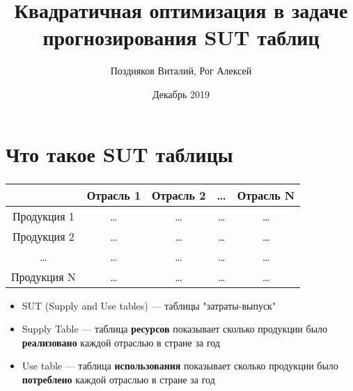 \documentclass{beamer}
\title{Квадратичная оптимизация в задаче прогнозирования SUT таблиц}
\author{Поздняков Виталий,  Рог Алексей}
\date{Декабрь 2019}
\begin{document}
\begin{frame}
\titlepage
\end{frame}

\section{Что такое SUT таблицы}

\begin{frame}
	\frametitle{\insertsection}

	\begin{center}
		\begin{tabular}{|c|c|c|c|c|}
			\hline
			& Отрасль 1 & Отрасль 2 & \dots & Отрасль N \\
			\hline
			Продукция 1	& \dots	& \dots	& \dots	& \dots \\
			Продукция 2	& \dots	& \dots	& \dots	& \dots \\
			\dots & \dots & \dots & \dots & \dots \\
			Продукция N	& \dots	& \dots	& \dots	& \dots \\
			\hline
		\end{tabular}
	\end{center}
	
	\begin{itemize}
    \item SUT (Supply and Use tables) — таблицы "затраты-выпуск"
    \item Supply Table — таблица \textbf{ресурсов} показывает сколько продукции было \textbf{реализовано} каждой отраслью в стране за год
    \item Use table — таблица \textbf{использования} показывает сколько продукции было \textbf{потреблено} каждой отраслью в стране за год
    \end{itemize}
    
\end{frame}
\end{document}

